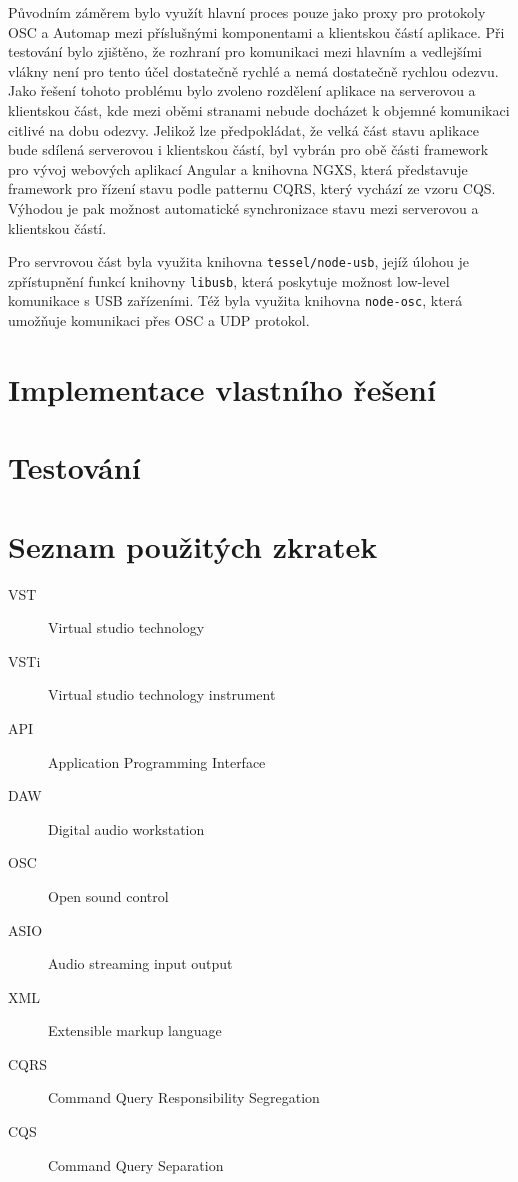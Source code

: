 \documentclass[thesis=M,czech]{FITthesis}[2019/03/06]
\begin{document}
		Původním záměrem bylo využít hlavní proces pouze jako proxy pro protokoly OSC a Automap mezi příslušnými komponentami a klientskou částí aplikace.
		Při testování bylo zjištěno, že rozhraní pro komunikaci mezi hlavním a vedlejšími vlákny není pro tento účel dostatečně rychlé a nemá dostatečně rychlou odezvu.
		Jako řešení tohoto problému bylo zvoleno rozdělení aplikace na serverovou a klientskou část, kde mezi oběmi stranami nebude docházet k objemné komunikaci citlivé na dobu odezvy.
		Jelikož lze předpokládat, že velká část stavu aplikace bude sdílená serverovou i klientskou částí, byl vybrán pro obě části framework pro vývoj webových aplikací Angular a knihovna NGXS, která
		představuje framework pro řízení stavu podle patternu CQRS\cite{cqrs}, který vychází ze vzoru CQS\cite{cqs}. Výhodou je pak možnost automatické synchronizace stavu mezi serverovou a klientskou částí.

		Pro servrovou část byla využita knihovna \texttt{tessel/node-usb}, jejíž úlohou je zpřístupnění funkcí knihovny \texttt{libusb}\cite{libusb}, která poskytuje možnost low-level komunikace s USB zařízeními.
		Též byla využita knihovna \texttt{node-osc}, která umožňuje komunikaci přes OSC a UDP protokol.
		
\chapter{Implementace vlastního řešení}

\chapter{Testování}

\begin{conclusion}
\end{conclusion}




\appendix

\chapter{Seznam použitých zkratek}
\begin{description}
	\item[VST] Virtual studio technology
	\item[VSTi] Virtual studio technology instrument
	\item[API] Application Programming Interface
	\item[DAW] Digital audio workstation
	\item[OSC] Open sound control
	\item[ASIO] Audio streaming input output
	\item[XML] Extensible markup language
	\item[CQRS] Command Query Responsibility Segregation
	\item[CQS] Command Query Separation
\end{description}
\end{document}
